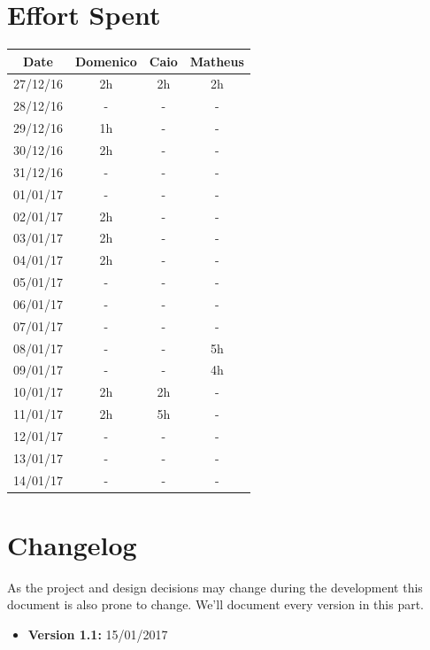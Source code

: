 \documentclass[a4paper]{article}
\begin{document}
\section{Effort Spent}
\begin{tabular}{ | c | c | c | c | }
\hline
	\textbf {Date} & \textbf {Domenico} & \textbf {Caio} & \textbf {Matheus} \\ \hline
	27/12/16& 2h & 2h & 2h  \\ \hline
	28/12/16& - & - & - \\ \hline
	29/12/16& 1h & - & - \\ \hline
	30/12/16& 2h & - & - \\ \hline
	31/12/16& - & - & - \\ \hline
	01/01/17& - & - & - \\ \hline
	02/01/17& 2h & - & - \\ \hline
	03/01/17& 2h & - & - \\ \hline
	04/01/17& 2h & - & - \\ \hline
	05/01/17& - & - & - \\ \hline
	06/01/17& - & - & - \\ \hline
	07/01/17& - & - & - \\ \hline
	08/01/17& - & - & 5h \\ \hline
	09/01/17& - & - & 4h \\ \hline
	10/01/17& 2h & 2h & - \\ \hline
	11/01/17& 2h & 5h & - \\ \hline
	12/01/17& - & - & - \\ \hline
	13/01/17& - & - & - \\ \hline
	14/01/17& - & - & - \\ \hline
\end{tabular}
\newpage

\section{Changelog}
As the project and design decisions may change during the development this document is also prone to change.
We'll document every version in this part.
\begin{itemize}
\item \textbf {Version 1.1:} 15/01/2017
\end{itemize}
\end{document}
